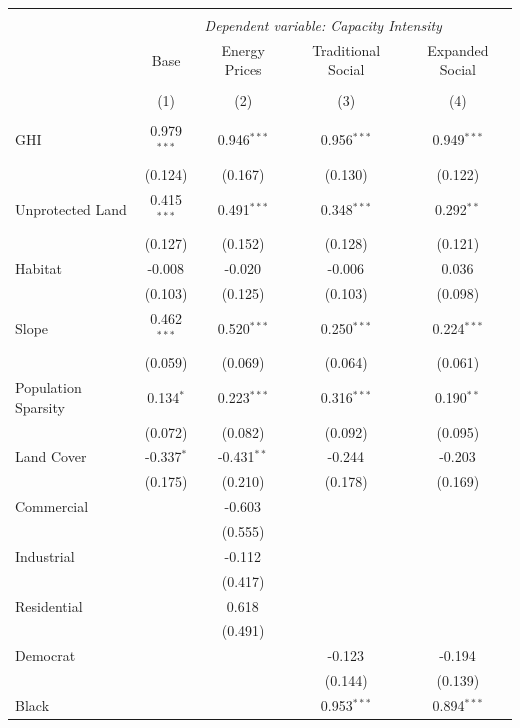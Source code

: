 \begin{table}[!htbp] \centering
\begin{tabular}{@{\extracolsep{5pt}}lcccc}
\\[-1.8ex]\hline
\hline \\[-1.8ex]
& \multicolumn{4}{c}{\textit{Dependent variable: Capacity Intensity}} \
\cr \cline{2-5}
\\[-1.8ex] & \multicolumn{1}{c}{Base} & \multicolumn{1}{c}{Energy Prices} & \multicolumn{1}{c}{Traditional Social} & \multicolumn{1}{c}{Expanded Social}  \\
\\[-1.8ex] & (1) & (2) & (3) & (4) \\
\hline \\[-1.8ex]
 GHI & 0.979$^{***}$ & 0.946$^{***}$ & 0.956$^{***}$ & 0.949$^{***}$ \\
& (0.124) & (0.167) & (0.130) & (0.122) \\
 Unprotected Land & 0.415$^{***}$ & 0.491$^{***}$ & 0.348$^{***}$ & 0.292$^{**}$ \\
& (0.127) & (0.152) & (0.128) & (0.121) \\
 Habitat & -0.008$^{}$ & -0.020$^{}$ & -0.006$^{}$ & 0.036$^{}$ \\
& (0.103) & (0.125) & (0.103) & (0.098) \\
 Slope & 0.462$^{***}$ & 0.520$^{***}$ & 0.250$^{***}$ & 0.224$^{***}$ \\
& (0.059) & (0.069) & (0.064) & (0.061) \\
 Population Sparsity & 0.134$^{*}$ & 0.223$^{***}$ & 0.316$^{***}$ & 0.190$^{**}$ \\
& (0.072) & (0.082) & (0.092) & (0.095) \\
 Land Cover & -0.337$^{*}$ & -0.431$^{**}$ & -0.244$^{}$ & -0.203$^{}$ \\
& (0.175) & (0.210) & (0.178) & (0.169) \\
 Commercial & & -0.603$^{}$ & & \\
& & (0.555) & & \\
 Industrial & & -0.112$^{}$ & & \\
& & (0.417) & & \\
 Residential & & 0.618$^{}$ & & \\
& & (0.491) & & \\
 Democrat & & & -0.123$^{}$ & -0.194$^{}$ \\
& & & (0.144) & (0.139) \\
 Black & & & 0.953$^{***}$ & 0.894$^{***}$ \\

\end{tabular}
\end{table}
